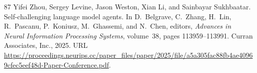 \begin{thebibliography}{87}
Yifei Zhou, Sergey Levine, Jason Weston, Xian Li, and Sainbayar Sukhbaatar.
\newblock Self-challenging language model agents.
\newblock In D.~Belgrave, C.~Zhang, H.~Lin, R.~Pascanu, P.~Koniusz, M.~Ghassemi, and N.~Chen, editors, \emph{Advances in Neural Information Processing Systems}, volume~38, pages 113959--113991. Curran Associates, Inc., 2025.
\newblock URL \url{https://proceedings.neurips.cc/paper_files/paper/2025/file/a5a305fac88fb4ae40969cfec5eef48d-Paper-Conference.pdf}.

\end{thebibliography}

